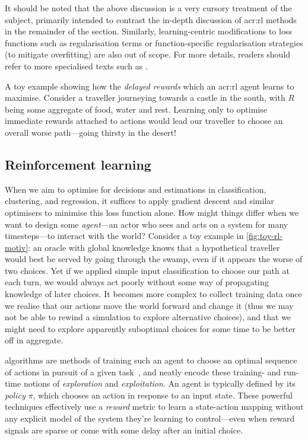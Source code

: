 It should be noted that the above discussion is a very cursory treatment of the subject, primarily intended to contrast the in-depth discussion of \gls{acr:rl} methods in the remainder of the section.
Similarly, learning-centric modifications to loss functions such as regularisation terms or function-specific regularisation strategies (to mitigate overfitting) are also out of scope.
For more details, readers should refer to more specialised texts such as \Textcite{DBLP:journals/siamrev/BottouCN18, DBLP:books/daglib/0040158}.

\begin{marginfigure}
	\centering
	\resizebox{0.9\linewidth}{!}{}
	\caption[A motivating example for MDPs in handling delayed rewards.]{A toy example showing how the \emph{delayed rewards} which an \gls{acr:rl} agent learns to maximise. Consider a traveller journeying towards a castle in the south, with $R$ being some aggregate of food, water and rest. Learning only to optimise immediate rewards attached to actions would lead our traveller to choose an overall worse path---going thirsty in the desert!}\label{fig:toy-rl-motiv}
\end{marginfigure}

\subsection{Reinforcement learning}
When we aim to optimise for decisions and estimations in classification, clustering, and regression, it suffices to apply gradient descent and similar optimisers to minimise this loss function alone.
How might things differ when we want to design some \emph{agent}---an actor who sees and acts on a system for many timesteps---to interact with the world?
Consider a toy example in \cref{fig:toy-rl-motiv}: an oracle with global knowledge knows that a hypothetical traveller would best be served by going through the swamp, even if it appears the worse of two choices.
Yet if we applied simple input classification to choose our path at each turn, we would always act poorly without some way of propagating knowledge of later choices.
It becomes more complex to collect training data once we realise that our actions move the world forward and change it (thus we may not be able to rewind a simulation to explore alternative choices), and that we might need to explore apparently suboptimal choices for some time to be better off in aggregate.

 algorithms are methods of training such an agent to choose an optimal sequence of actions in pursuit of a given task~\parencite{RL2E}, and neatly encode these training- and run-time notions of \emph{exploration} and \emph{exploitation}.
An agent is typically defined by its \emph{policy} $\pi$, which chooses an action in response to an input state.
These powerful techniques effectively use a \emph{reward} metric to learn a state-action mapping without any explicit model of the system they're learning to control---even when reward signals are sparse or come with some delay after an initial choice.

